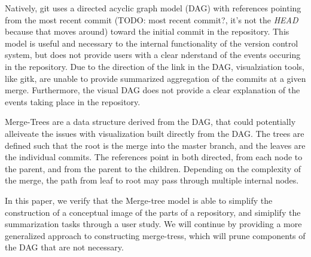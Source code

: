 Natively, git uses a directed acyclic graph model (DAG) with references
pointing from the most recent commit (TODO: most recent commit?, it's
not the \emph{HEAD} because that moves around) toward the initial commit
in the repository. This model is useful and necessary to the internal
functionality of the version control system, but does not provide users
with a clear nderstand of the events occuring in the repository. Due to
the direction of the link in the DAG, visualziation tools, like gitk,
are unable to provide summarized aggregation of the commits at a given
merge.  Furthermore, the visual DAG does not provide a clear explanation
of the events taking place in the repository.

Merge-Trees are a data structure derived from the DAG, that could
potentially alleiveate the issues with visualization built directly from
the DAG. The trees are defined such that the root is the merge into the
master branch, and the leaves are the individual commits. The references
point in both directed, from each node to the parent, and from the
parent to the children. Depending on the complexity of the merge, the
path from leaf to root may pass through multiple internal nodes.

In this paper, we verify that the Merge-tree model is able to simplify
the construction of a conceptual image of the parts of a repository, and
simiplify the summarization tasks through a user study. We will continue
by providing a more generalized approach to constructing merge-tress,
which will prune components of the DAG that are not necessary.


